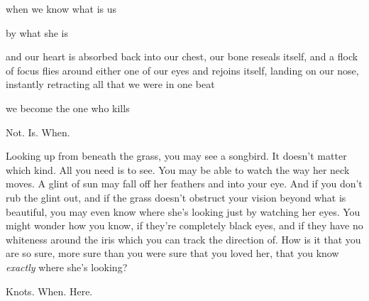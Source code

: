 \documentclass[11pt]{article}
\begin{document}
\begingroup
\begin{center}
when we know what is us
\rightskip\leftskip
\end{center}
\endgroup

\begingroup
\begin{center}
by what she is
\rightskip\leftskip
\end{center}
\endgroup

\begingroup
\begin{center}
and our heart is absorbed back into our chest, our bone reseals itself, and a flock of focus flies around either one of our eyes and rejoins itself, landing on our nose, instantly retracting all that we were in one beat
\rightskip\leftskip
\end{center}
\endgroup

\begingroup
\begin{center}
we become the one who kills
\rightskip\leftskip
\end{center}
\endgroup

\vspace*{4\baselineskip}

\begingroup
\begin{center}
Not. Is. When.
\rightskip\leftskip
\end{center}
\endgroup

\vspace*{4\baselineskip}

\begingroup
Looking up from beneath the grass, you may see a songbird. It doesn't matter which kind. All you need is to see. You may be able to watch the way her neck moves. A glint of sun may fall off her feathers and into your eye. And if you don't rub the glint out, and if the grass doesn't obstruct your vision beyond what is beautiful, you may even know where she's looking just by watching her eyes. You might wonder how you know, if they're completely black eyes, and if they have no whiteness around the iris which you can track the direction of. How is it that you are so sure, more sure than you were sure that you loved her, that you know \textit{exactly} where she's looking?
\endgroup

\vspace*{4\baselineskip}

\begingroup
\begin{center}
Knots. When. Here.
\rightskip\leftskip
\end{center}
\endgroup
\end{document}
